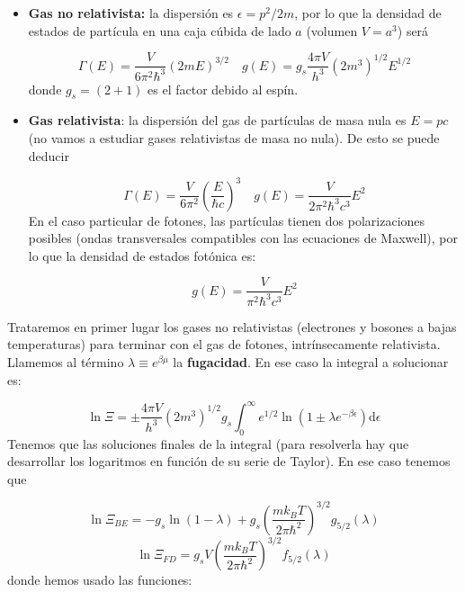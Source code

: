 \documentclass[12pt,a4paper]{article}
\numberwithin{equation}{section}
\numberwithin{figure}{section}
\newcommand{\parentesis}[1]{\left( #1  \right)}
\newcommand{\D}{\mathrm{d}}
\theoremstyle{definition}
\begin{document}
\begin{itemize}
\item \textbf{Gas no relativista:} la dispersión es $\epsilon = p^2 /2m$, por lo que la densidad de estados de partícula en una caja cúbida de lado $a$ (volumen $V=a^3$) será

\begin{equation}
\Gamma (E) = \frac{V}{6 \pi^2 \hbar^3} (2mE)^{3/2} \quad g(E) = g_s \frac{4 \pi V}{h^3} (2m^3)^{1/2} E^{1/2}
\end{equation}
donde $g_s=(2+1)$ es el factor debido al espín. \\

\item \textbf{Gas relativista}: la dispersión del gas de partículas de masa nula es $E=pc$ (no vamos a estudiar gases relativistas de masa no nula). De esto se puede deducir

\begin{equation}
\Gamma (E) = \frac{V}{6 \pi^2}  \parentesis{\frac{E}{\hbar c}}^3 \quad g(E) = \frac{V}{2 \pi^2 \hbar^3 c^3} E^2
\end{equation}
En el caso particular de fotones, las partículas tienen dos polarizaciones posibles (ondas transversales compatibles con las ecuaciones de Maxwell), por lo que la densidad de estados fotónica es:

\begin{equation}
g(E) = \frac{V}{\pi^2 \hbar^3 c^3} E^2
\end{equation}
\end{itemize}

Trataremos en primer lugar los gases no relativistas (electrones y bosones a bajas temperaturas) para terminar con el gas de fotones, intrínsecamente relativista. Llamemos al término $\lambda\equiv e^{\beta \mu}$ la \textbf{fugacidad}. En ese caso la integral a solucionar es:

\begin{equation}
\ln \Xi = \pm \frac{4 \pi V}{h^3} (2m^3)^{1/2} g_s \int_0^\infty e^{1/2} \ln (1\pm \lambda e^{-\beta \epsilon}) \D \epsilon
\end{equation}
Tenemos que las soluciones finales de la integral (para resolverla hay que desarrollar los logaritmos en función de su serie de Taylor). En ese caso tenemos que

\begin{equation}
\ln \Xi_{BE} = - g_s \ln (1- \lambda)+ g_s \parentesis{\frac{mk_B T}{2\pi \hbar^2}}^{3/2} g_{5/2} (\lambda)
\end{equation}
\begin{equation}
\ln \Xi_{FD} = g_s V \parentesis{\frac{mk_BT}{2\pi \hbar^2}}^{3/2} f_{5/2} (\lambda)
\end{equation}
donde hemos usado las funciones:
\end{document}

